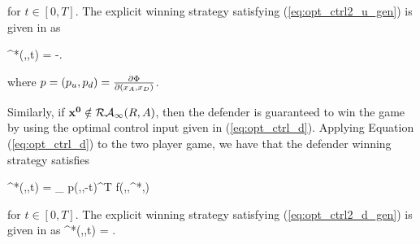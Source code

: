 \noindent for $t \in [0,T]$. The explicit winning strategy satisfying (\ref{eq:opt_ctrl2_u_gen}) is given in \cite{Huang2011} as

\bq \label{eq:opt_ctrl2_a}
\ca^*(\xa,\xb,t) = -\vela {}.
\eq

\noindent where $p = (p_u,p_d) = \frac{\partial \Phi}{\partial (x_A,x_D)}$.  

Similarly, if $\mathbf{x^0}\notin\mathcal{RA}_\infty(R,A)$, then the defender is guaranteed to win the game by using the optimal control input given in (\ref{eq:opt_ctrl_d}). Applying Equation (\ref{eq:opt_ctrl_d}) to the two player game, we have that the defender winning strategy satisfies 

\bq \label{eq:opt_ctrl2_d_gen}
  \cb^*(\xa,\xb,t) = \arg \max_{\cb \in {}} p(\xa,\xb,-t)^T f(\xa,\xb,\ca^*,\cb)
\eq

\noindent for $t \in [0,T]$. The explicit winning strategy satisfying (\ref{eq:opt_ctrl2_d_gen}) is given in \cite{Huang2011} as
\bq \label{eq:opt_ctrl2_d}
\cb^*(\xa,\xb,t) = \velb {}.
\eq

